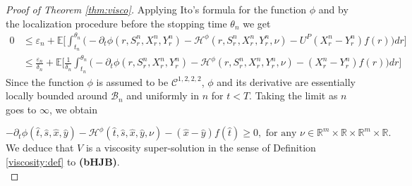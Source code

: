 \documentclass[11pt,a4paper]{article}
\theoremstyle{thmstyleone}%
\theoremstyle{thmstyletwo}%
\theoremstyle{thmstylethree}%
\newcommand{\E}{\mathbb{E}}
\begin{document}
\begin{proof}[Proof of Theorem \ref{thm:visco}]
Applying Ito's formula for the function $\phi$ and by the localization procedure before the stopping time $\theta_n$ we get
\begin{align*}
0&\leq \varepsilon_n+ \E\bigl[\int_{t_n}^{\theta_n}\big( -\partial_t \phi(r,S_r^n,X_r^n,Y_r^n)- \mathcal H^\phi(r,S_r^n,X_r^n,Y_r^n,\nu)-U^P(X_{r}^{n} - Y^{n}_r) f(r)\big)dr \bigl]\\
&\leq \frac{\varepsilon_n}{\delta_n}+ \E\bigl[\frac1{\delta_n}\int_{t_n}^{\theta_n}\big( -\partial_t \phi(r,S_r^n,X_r^n,Y_r^n)- \mathcal H^\phi(r,S_r^n,X_r^n,Y_r^n,\nu)-(X_{r}^{n} - Y^{n}_r) f(r)\big)dr \bigl]
\end{align*}
Since the function $\phi$ is assumed to be $\mathcal C^{1,2,2,2}$, $\phi$ and its derivative are essentially locally bounded around $\mathcal B_n$ and uniformly in $n$ for $t<T$. Taking the limit as $n$ goes to $\infty$, we obtain 

\[-\partial_t \phi(\hat t,\hat s,\hat x,\hat y)- \mathcal H^\phi(\hat t,\hat s,\hat x,\hat y,\nu)-(\hat x - \hat y) f(\hat t)\geq 0,\text{ for any }\nu\in \mathbb R^{m}\times\mathbb R\times \mathbb R^m\times \mathbb R.\]
We deduce that $V$ is a viscosity super-solution in the sense of Definition \ref{viscosity:def} to \textbf{(bHJB)}.\\


\end{proof}
\end{document}
